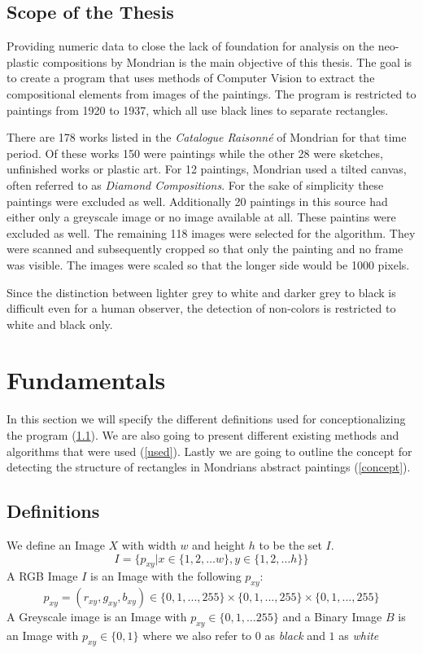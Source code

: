 \documentclass[serif,article,noparskip]{agse-thesis}
\begin{document}
\subsection{Scope of the Thesis}

Providing numeric data to close the lack of foundation for analysis on the
neo-plastic compositions by Mondrian is the main objective of this thesis. The
goal is to create a program that uses methods of Computer Vision to extract the
compositional elements from images of the paintings. The program is restricted
to paintings from 1920 to 1937, which all use black lines to separate rectangles.

There are 178 works listed in the \textit{Catalogue Raisonn{\'e}}
\cite{joosten1998} of Mondrian for that time period. Of these works 150 were
paintings while the other 28 were sketches, unfinished works or plastic art. For
12 paintings, Mondrian used a tilted canvas, often referred to as
\textit{Diamond Compositions}. For the sake of simplicity these paintings were
excluded as well. Additionally 20 paintings in this source had either only a
greyscale image or no image available at all. These paintins were excluded as
well. The remaining 118 images were selected for the algorithm. They were
scanned and subsequently cropped so that only the painting and no frame was
visible. The images were scaled so that the longer side would be 1000 pixels.

Since the distinction between lighter grey to white and darker grey to black is
difficult even for a human observer, the detection of non-colors is restricted
to white and black only.

\section{Fundamentals} \label{fundamentals}

In this section we will specify the different definitions used for
conceptionalizing the program (\ref{definitions}). We are also going to present
different existing methods and algorithms that were used (\ref{used}).
Lastly we are going to outline the concept for detecting the structure of rectangles
in Mondrians abstract paintings (\ref{concept}).

\subsection{Definitions} \label{definitions}

We define an Image $X$ with width $w$ and height $h$ to be the set $I$.
$$I = \{p_{xy} | x \in \{1,2, \dots w\}, y \in \{1,2, \dots h\} \}$$
A RGB Image $I$ is an Image with the following  $p_{xy}$: $$p_{xy} = (r_{xy}, g_{xy}, b_{xy}) \in \{0,1,...,255\} \times
\{0,1,...,255\} \times\{0,1,...,255\}$$ A Greyscale image is an Image with
$p_{xy} \in \{0,1, \dots 255\}$ and a Binary Image $B$ is an Image with $p_{xy} \in \{0,1\}$ where we also refer to
$0$ as \textit{black} and $1$ as \textit{white}
\end{document}
